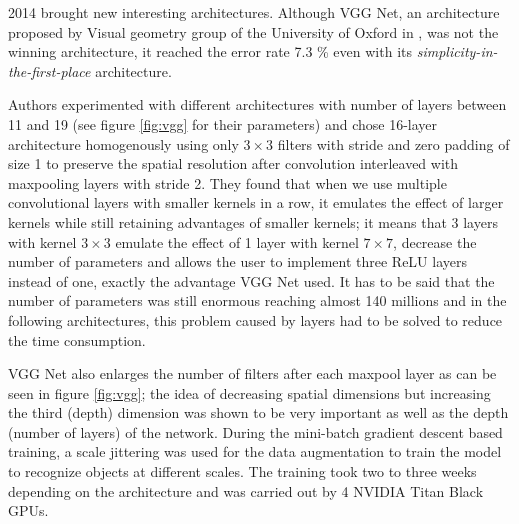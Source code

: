 2014 brought new interesting architectures. Although VGG Net, an architecture proposed by Visual geometry group of the University of Oxford in \cite{vgg}, was not the winning architecture, it reached the error rate 7.3 \% even with its \textit{simplicity-in-the-first-place} architecture.

Authors experimented with different architectures with number of layers between 11 and 19 (see figure \ref{fig:vgg} for their parameters) and chose 16-layer architecture homogenously using only $3 \times 3$ filters with stride and zero padding of size 1 to preserve the spatial resolution after convolution interleaved with maxpooling layers with stride 2. They found that when we use multiple convolutional layers with smaller kernels in a row, it emulates the effect of larger kernels while still retaining advantages of smaller kernels; it means that 3 layers with kernel $3 \times 3$ emulate the effect of 1 layer with kernel $7 \times 7$, decrease the number of parameters and allows the user to implement three ReLU layers instead of one, exactly the advantage VGG Net used. It has to be said that the number of parameters was still enormous reaching almost 140 millions and in the following architectures, this problem caused by  layers had to be solved to reduce the time consumption.

VGG Net also enlarges the number of filters after each maxpool layer as can be seen in figure \ref{fig:vgg}; the idea of decreasing spatial dimensions but increasing the third (depth) dimension was shown to be very important as well as the depth (number of layers) of the network. During the mini-batch gradient descent based training, a scale jittering was used for the data augmentation to train the model to recognize objects at different scales. The training took two to three weeks depending on the architecture and was carried out by 4 NVIDIA Titan Black GPUs.


